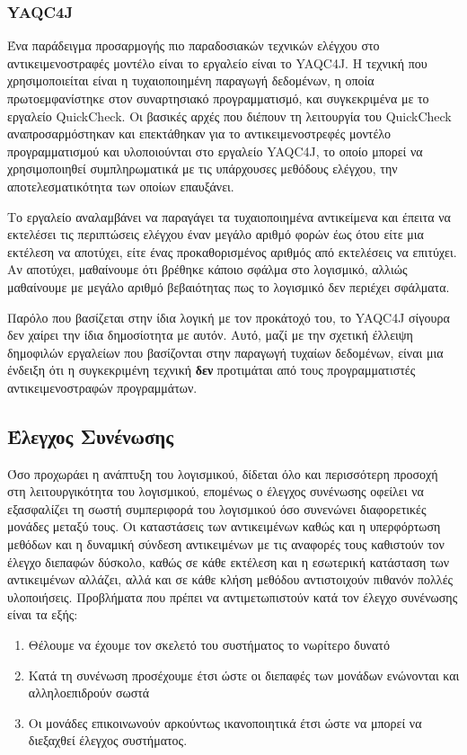 \documentclass[12pt]{article}
\begin{document}
\subsubsection{YAQC4J}

Ένα παράδειγμα προσαρμογής πιο παραδοσιακών τεχνικών ελέγχου στο αντικειμενοστραφές μοντέλο είναι το εργαλείο είναι το YAQC4J. Η τεχνική που χρησιμοποιείται είναι η τυχαιοποιημένη παραγωγή δεδομένων, η οποία πρωτοεμφανίστηκε στον συναρτησιακό προγραμματισμό, και συγκεκριμένα με το εργαλείο QuickCheck\cite{quickcheck}. Οι βασικές αρχές που διέπουν τη λειτουργία του QuickCheck αναπροσαρμόστηκαν και επεκτάθηκαν για το αντικειμενοστρεφές μοντέλο προγραμματισμού και υλοποιούνται στο εργαλείο YAQC4J, το οποίο μπορεί να χρησιμοποιηθεί συμπληρωματικά με τις υπάρχουσες μεθόδους ελέγχου, την αποτελεσματικότητα των οποίων επαυξάνει\cite{andres}.

\par Το εργαλείο αναλαμβάνει να παραγάγει τα τυχαιοποιημένα αντικείμενα και έπειτα να εκτελέσει τις περιπτώσεις ελέγχου έναν μεγάλο αριθμό φορών έως ότου είτε μια εκτέλεση να αποτύχει, είτε ένας προκαθορισμένος αριθμός από εκτελέσεις να επιτύχει. Αν αποτύχει, μαθαίνουμε ότι βρέθηκε κάποιο σφάλμα στο λογισμικό, αλλιώς μαθαίνουμε με μεγάλο αριθμό βεβαιότητας πως το λογισμικό δεν περιέχει σφάλματα.

\par Παρόλο που βασίζεται στην ίδια λογική με τον προκάτοχό του, το YAQC4J σίγουρα δεν χαίρει την ίδια δημοσίοτητα με αυτόν. Αυτό, μαζί με την σχετική έλλειψη δημοφιλών εργαλείων που βασίζονται στην παραγωγή τυχαίων δεδομένων, είναι μια ένδειξη ότι η συγκεκριμένη τεχνική \textbf{δεν} προτιμάται από τους προγραμματιστές αντικειμενοστραφών προγραμμάτων.

\subsection{Έλεγχος Συνένωσης} 

Όσο προχωράει η ανάπτυξη του λογισμικού, δίδεται όλο και περισσότερη προσοχή στη λειτουργικότητα του λογισμικού, επομένως ο έλεγχος συνένωσης οφείλει να εξασφαλίζει τη σωστή συμπεριφορά του λογισμικού όσο συνενώνει διαφορετικές μονάδες μεταξύ τους. Οι καταστάσεις των αντικειμένων καθώς και η υπερφόρτωση μεθόδων και η δυναμική σύνδεση αντικειμένων με τις αναφορές τους καθιστούν τον έλεγχο διεπαφών δύσκολο, καθώς σε κάθε εκτέλεση και η εσωτερική κατάσταση των αντικειμένων αλλάζει, αλλά και σε κάθε κλήση μεθόδου αντιστοιχούν πιθανόν πολλές υλοποιήσεις.
Προβλήματα που πρέπει να αντιμετωπιστούν κατά τον έλεγχο συνένωσης είναι τα εξής: 
\begin{enumerate}
  \item Θέλουμε να έχουμε τον σκελετό του συστήματος το νωρίτερο δυνατό
  \item Κατά τη συνένωση προσέχουμε έτσι ώστε οι διεπαφές των μονάδων ενώνονται και αλληλοεπιδρούν σωστά
  \item Οι μονάδες επικοινωνούν αρκούντως ικανοποιητικά έτσι ώστε να μπορεί να διεξαχθεί έλεγχος συστήματος.
\end{enumerate}
\end{document}

